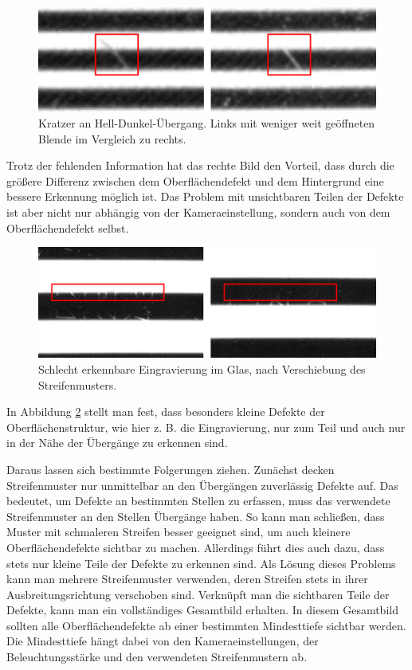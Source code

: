 \begin{figure}[H]
	\centering
	\includegraphics[width=\textwidth]{03_sichtpruefungDurchLichtstreuung/verfahren/figures/visibleScratch}
	\caption[Kratzer]{Kratzer an Hell-Dunkel-Übergang. Links mit weniger weit geöffneten Blende im Vergleich zu rechts.}
	\label{img:scratches}
\end{figure}

\noindent
Trotz der fehlenden Information hat das rechte Bild den Vorteil, dass durch die größere Differenz zwischen dem Oberflächendefekt und dem Hintergrund eine bessere Erkennung möglich ist.
Das Problem mit unsichtbaren Teilen der Defekte ist aber nicht nur abhängig von der Kameraeinstellung, sondern auch von dem Oberflächendefekt selbst.

\begin{figure}[H]
	\centering
	\includegraphics[width=\textwidth]{03_sichtpruefungDurchLichtstreuung/verfahren/figures/minorScratch}
	\caption[Eingravierung im Glas]{Schlecht erkennbare Eingravierung im Glas, nach Verschiebung des Streifenmusters.}
	\label{img:engraving}
\end{figure}

\noindent
In Abbildung \ref{img:engraving} stellt man fest, dass besonders kleine Defekte der Oberflächenstruktur, wie hier z. B. die Eingravierung, nur zum Teil und auch nur in der Nähe der Übergänge zu erkennen sind.

\p
Daraus lassen sich bestimmte Folgerungen ziehen.
Zunächst decken Streifenmuster nur unmittelbar an den Übergängen zuverlässig Defekte auf.
Das bedeutet, um Defekte an bestimmten Stellen zu erfassen, muss das verwendete Streifenmuster an den Stellen Übergän\-ge haben.
So kann man schließen, dass Muster mit schmaleren Streifen besser geeignet sind, um auch kleinere Oberflächendefekte sichtbar zu machen.
Allerdings führt dies auch dazu, dass stets nur kleine Teile der Defekte zu erkennen sind.
Als Lösung dieses Problems kann man mehrere Streifenmuster verwenden, deren Streifen stets in ihrer Ausbreitungsrichtung verschoben sind.
Verknüpft man die sichtbaren Teile der Defekte, kann man ein vollständiges Gesamtbild erhalten.
In diesem Gesamtbild sollten alle Oberflächendefekte ab einer bestimmten Mindesttiefe sichtbar werden.
Die Mindesttiefe hängt dabei von den Kameraeinstellungen, der Beleuchtungsstärke und den verwendeten Streifenmustern ab.